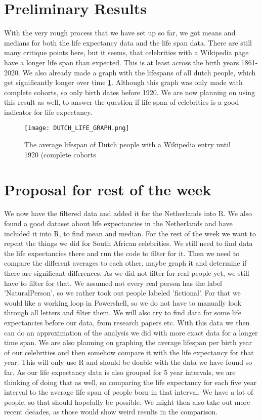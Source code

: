 \documentclass{article}
\begin{document}
\section{Preliminary Results}
With the very rough process that we have set up so far, we got means and medians for both the life expectancy data and the life span data. There are still many critique points here, but it seems, that celebrities with a Wikipedia page have a longer life span than expected. This is at least across the birth years 1861-2020. 
We also already made a graph with the lifespans of all dutch people, which get significantly longer over time \ref{fig:cohorts}. Although this graph was only made with complete cohorts, so only birth dates before 1920. We are now planning on using this result as well, to answer the question if life span of celebrities is a good indicator for life expectancy. 

\begin{figure}
	\centering
	\texttt{[image: DUTCH\_LIFE\_GRAPH.png]}
	\caption{The average lifespan of Dutch people with a Wikipedia entry until 1920 (complete cohorts}
	\label{fig:cohorts}
\end{figure}

\section{Proposal for rest of the week}
We now have the filtered data and added it for the Netherlands into R. We also found a good dataset about life expectancies in the Netherlands and have included it into R, to find mean and median. For the rest of the week we want to repeat the things we did for South African celebrities. We still need to find data the life expectancies there and run the code to filter for it. Then we need to compare the different averages to each other, maybe graph it and determine if there are significant differences. 
As we did not filter for real people yet, we still have to filter for that. We assumed not every real person has the label 'NaturalPerson', so we rather took out people labeled 'fictional'. For that we would like a working loop in Powershell, so we do not have to manually look through all letters and filter them. 
We will also try to find data for some life expectancies before our data, from research papers etc. With this data we then can do an approximation of the analysis we did with more exact data for a longer time span.
We are also planning on graphing the average lifespan per birth year of our celebrities and then somehow compare it with the life expectancy for that year. This will only use R and should be doable with the data we have found so far. As our life expectancy data is also grouped for 5 year intervals, we are thinking of doing that as well, so comparing the life expectancy for each five year interval to the average life span of people born in that interval. We have a lot of people, so that should hopefully be possible. We might then also take out more recent decades, as those would show weird results in the comparison. 
\end{document}

